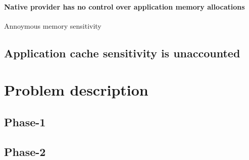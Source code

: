 	 \paragraph{Native provider has no control over application memory allocations}
	    Annoymous memory sensitivity
      \subsection{Application cache sensitivity is unaccounted}
    
  \section{Problem description}
  
   \subsection{Phase-1}
   \subsection{Phase-2}
  
  